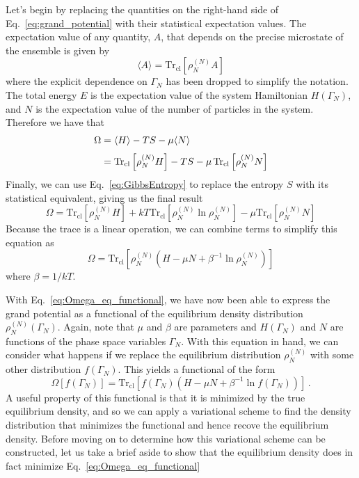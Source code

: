 \documentclass{report}
\newcommand{\trace}{\operatorname{Tr_{cl}}}
\begin{document}
Let's begin by replacing the quantities on the right-hand side of Eq.~\ref{eq:grand_potential} with their statistical expectation values. The expectation value of any quantity, \(A\), that depends on the precise microstate of the ensemble is given by 
\begin{equation}
    \langle A \rangle = \trace \left[\rho_N^{(N)}A\right]
    \label{eq:trace}
\end{equation}
where the explicit dependence on \(\Gamma_N\) has been dropped to simplify the notation. The total energy \(E\) is the expectation value of the system Hamiltonian \(H(\Gamma_N)\), and \(N\) is the expectation value of the number of particles in the system. Therefore we have that
\begin{equation}
    \setlength{\jot}{6pt}
    \begin{split}
    \Omega &= \langle H \rangle - TS - \mu \langle N \rangle \\
    &= \trace\left[\rho_N^{(N)}H\right] - TS - \mu \trace\left[\rho_N^{(N)}N\right]
    \end{split}
\end{equation}
Finally, we can use Eq.~\ref{eq:GibbsEntropy} to replace the entropy \(S\) with its statistical equivalent, giving us the final result
\begin{equation}
    \Omega = \trace\left[\rho_N^{(N)}H\right] + kT \trace\left[\rho_N^{(N)}\ln\rho_N^{(N)}\right] - \mu \trace\left[\rho_N^{(N)}N\right]
\end{equation}
Because the trace is a linear operation, we can combine terms to simplify this equation as
\begin{equation}
    \Omega = \trace\left[\rho_N^{(N)} \left(H - \mu N + \beta^{-1}\ln{\rho_N^{(N)}}\right)\right]
    \label{eq:Omega_eq_functional}
\end{equation}
where \(\beta = 1 / k T\). 

With Eq.~\ref{eq:Omega_eq_functional}, we have now been able to express the grand potential as a functional of the equilibrium density distribution \(\rho_N^{(N)}(\Gamma_N)\). Again, note that \(\mu\) and \(\beta\) are parameters and \(H(\Gamma_N)\) and \(N\) are functions of the phase space variables \(\Gamma_N\). With this equation in hand, we can consider what happens if we replace the equilibrium distribution \(\rho_N^{(N)}\) with some other distribution \(f(\Gamma_N)\). This yields a functional of the form
\begin{equation}
    \Omega\left[f(\Gamma_N)\right] = \trace\left[f(\Gamma_N) \left(H - \mu N + \beta^{-1}\ln{f(\Gamma_N)}\right)\right] \,.
    \label{eq:Omega_functional}
\end{equation}
A useful property of this functional is that it is minimized by the true equilibrium density, and so we can apply a variational scheme to find the density distribution that minimizes the functional and hence recove the equilibrium density. Before moving on to determine how this variational scheme can be constructed, let us take a brief aside to show that the equilibrium density does in fact minimize Eq.~\ref{eq:Omega_eq_functional}
\end{document}
